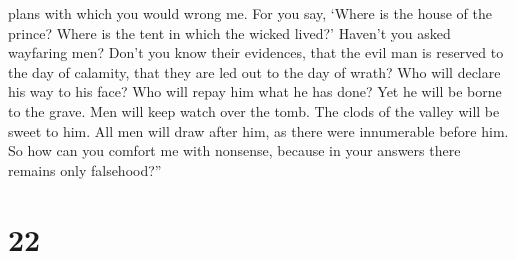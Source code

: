 plans with which you would wrong me.  For you say, `Where
is the house of the prince? Where is the tent in which the wicked
lived?'  Haven't you asked wayfaring men? Don't you know
their evidences,  that the evil man is reserved to the day
of calamity, that they are led out to the day of wrath? 
Who will declare his way to his face? Who will repay him what he has
done?  Yet he will be borne to the grave. Men will keep
watch over the tomb.  The clods of the valley will be sweet
to him. All men will draw after him, as there were innumerable before
him.  So how can you comfort me with nonsense, because in
your answers there remains only falsehood?''

\hypertarget{section-16}{%
\section{22}\label{section-16}}

